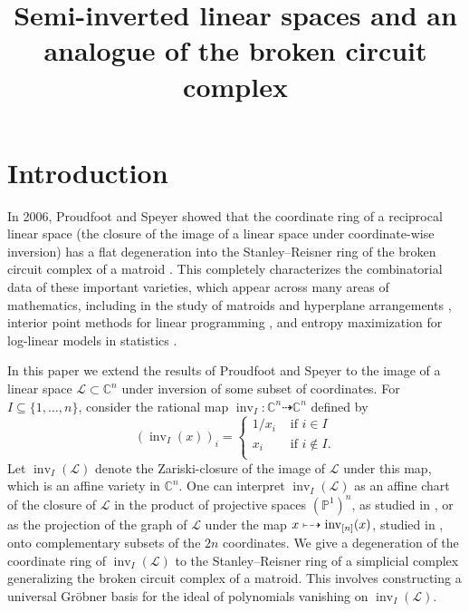\documentclass[ALCO,ThmDefs,Unicode,epreuves]{cedram}
\author{\firstname{Georgy} \lastname{Scholten}}
\author{\firstname{Cynthia} \lastname{Vinzant}}
\title[Semi-inverted linear spaces]{Semi-inverted linear spaces and an analogue of the broken circuit complex}
\newcommand{\PP}{\mathbb{P}}
\newcommand{\Cbb}{\mathbb{C}}
\newcommand{\cL}{\mathcal{L}}
\DeclareMathOperator{\inv}{inv}
\def\dashmapsto{\mapstochar\dashrightarrow}
\begin{document}

\maketitle

\section{Introduction}
In 2006, Proudfoot and Speyer showed that the coordinate ring of a reciprocal linear space (\ie the closure of the image of 
a linear space under coordinate-wise inversion) has a flat degeneration into the Stanley--Reisner ring of the broken circuit complex of a matroid \cite{PS}. 
This completely characterizes the combinatorial data of these important varieties, which appear across many areas of mathematics, including 
in the study of matroids and hyperplane arrangements \cite{Terao}, interior point methods for linear programming \cite{DLSV12}, and entropy maximization for log-linear models in statistics \cite{MSUZ14}. 

In this paper we extend the results of Proudfoot and Speyer to the image of a linear space $\cL\subset \Cbb^n$ under inversion of some subset of coordinates.
For $I\subseteq \{1,\ldots , n\}$, consider the rational map $\inv_I: \Cbb^n \dashrightarrow \Cbb^n $ defined by 
\[(\inv_I(x))_i =
\begin{cases}
1/x_i &\text{ if } i\in I\\
x_i &\text{ if } i\not\in I.\\
\end{cases}
\]
Let $\inv_I(\cL)$ denote the Zariski-closure of the image of $\cL$ under this map, which is an affine variety in $\Cbb^n$. One can interpret $\inv_I(\cL)$ as 
an affine chart of the closure of $\cL$ in the product of projective spaces $(\PP^1)^n$, as studied in \cite{AB16}, or as the projection 
of the graph of $\cL$ under the map $x\dashmapsto \inv_{[n]}(x)$, studied in \cite{FSW17}, onto complementary subsets of the $2n$ coordinates. 
We give a degeneration of the coordinate ring of $\inv_I(\cL)$
to the Stanley--Reisner ring of a simplicial complex generalizing the broken circuit complex of a matroid. 
This involves constructing a universal Gr\"obner basis for the ideal of polynomials vanishing on $\inv_I(\cL)$.
\end{document}
